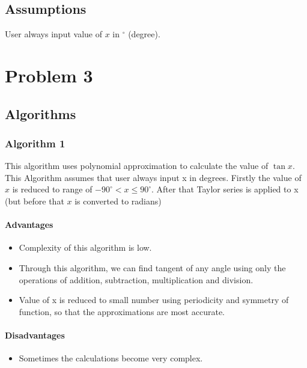 \documentclass{article}
\begin{document}
\section{Assumptions}
User always input value of $x$ in \(^{\circ}\) (degree).

\pagebreak
\chapter{Problem 3}
\section{Algorithms}
\subsection{Algorithm 1}
This algorithm uses polynomial approximation to calculate the value of $\tan x$. This Algorithm assumes that user always input x in degrees. Firstly the value of $x$ is reduced to range of  \(-90^{\circ}<x\leq90^{\circ}\). After that Taylor series is applied to x (but before that $x$ is converted to radians)
\subsubsection{Advantages}
\begin{itemize}
    \item Complexity of this algorithm is low.
    \item Through this algorithm, we can find tangent of any angle using only the operations of addition, subtraction, multiplication and division. 
    \item Value of x is reduced to small number using periodicity and symmetry of function, so that the approximations are most accurate.
\end{itemize}
\subsubsection{Disadvantages}
\begin{itemize}
    
    \item Sometimes the calculations become very complex.
    
\end{itemize}
\end{document}
